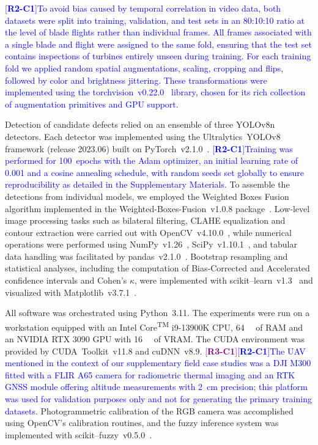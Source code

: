 \documentclass[energies,article,submit,pdftex,moreauthors]{Definitions/mdpi}
\newcommand{\revtag}[2]{[\textbf{R#1-C#2}]}
\newcommand{\Rtwo}[1]{\textcolor{blue}{#1}}
\newcommand{\Rthree}[1]{\textcolor{purple}{#1}}
\begin{document}
\Rtwo{\revtag{2}{1}To avoid bias caused by temporal correlation in video data, both datasets were split into training, validation, and test sets in an 80:10:10 ratio at the level of blade flights rather than individual frames. All frames associated with a single blade and flight were assigned to the same fold, ensuring that the test set contains inspections of turbines entirely unseen during training. For each training fold we applied random spatial augmentations, scaling, cropping and flips, followed by color and brightness jittering. These transformations were implemented using the torchvision~v0.22.0~\cite{Torchvision2016} library, chosen for its rich collection of augmentation primitives and GPU support.}

Detection of candidate defects relied on an ensemble of three YOLOv8n detectors. Each detector was implemented using the Ultralytics~YOLOv8 framework (release 2023.06) built on PyTorch~v2.1.0~\cite{paszke2019pytorch}. \Rtwo{\revtag{2}{1}Training was performed for 100~epochs with the Adam optimizer, an initial learning rate of 0.001 and a cosine annealing schedule, with random seeds set globally to ensure reproducibility as detailed in the Supplementary Materials.} To assemble the detections from individual models, we employed the Weighted Boxes Fusion algorithm implemented in the Weighted-Boxes-Fusion~v1.0.8 package~\cite{zfturbo2022wbf}. Low‑level image processing tasks such as bilateral filtering, CLAHE equalization and contour extraction were carried out with OpenCV~v4.10.0~\cite{bradski2000opencv}, while numerical operations were performed using NumPy~v1.26~\cite{harris2020numpy}, SciPy~v1.10.1~\cite{virtanen2020scipy}, and tabular data handling was facilitated by pandas~v2.1.0~\cite{mckinney2010pandas}. Bootstrap resampling and statistical analyses, including the computation of Bias‑Corrected and Accelerated confidence intervals and Cohen’s \(\kappa\), were implemented with scikit–learn~v1.3~\cite{pedregosa2011scikit} and visualized with Matplotlib~v3.7.1~\cite{hunter2007matplotlib}.

All software was orchestrated using Python~3.11. The experiments were run on a workstation equipped with an Intel\textsuperscript{\textregistered} Core\textsuperscript{TM} i9-13900K CPU, \SI{64}{\gibi\byte} of RAM and an NVIDIA\textsuperscript{\textregistered} RTX 3090 GPU with \SI{16}{\gibi\byte} of VRAM. The CUDA environment was provided by CUDA~Toolkit~v11.8 and cuDNN~v8.9. \Rthree{\revtag{3}{1}}\Rtwo{\revtag{2}{1}The UAV mentioned in the context of our supplementary field case studies was a DJI M300 fitted with a FLIR A65 camera for radiometric thermal imaging and an RTK GNSS module offering altitude measurements with \SI{2}{\centi\metre} precision; this platform was used for validation purposes only and not for generating the primary training datasets.} Photogrammetric calibration of the RGB camera was accomplished using OpenCV's calibration routines, and the fuzzy inference system was implemented with scikit–fuzzy~v0.5.0~\cite{warner2018scikitfuzzy}.
\end{document}

